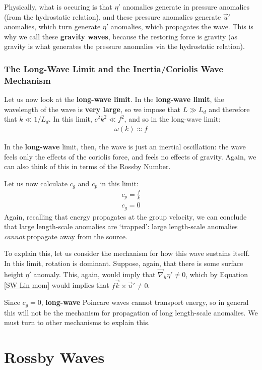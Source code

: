 Physically, what is occuring is that $\eta'$ anomalies generate in pressure anomalies (from the hydrostatic relation), and these pressure anomalies generate $\vec{u}'$ anomalies, which turn generate $\eta'$ anomalies, which propagates the wave. This is why we call these \textbf{gravity waves}, because the restoring force is gravity (as gravity is what generates the pressure anomalies via the hydrostatic relation).

\subsubsection{The Long-Wave Limit and the Inertia/Coriolis Wave Mechanism}

Let us now look at the \textbf{long-wave limit}. In the \textbf{long-wave limit}, the wavelength of the wave is \textbf{very large}, so we impose that $L\gg L_d$ and therefore that $k \ll 1/L_d$. In this limit, $c^2k^2\ll f^2$, and so in the long-wave limit:
\begin{align*}
    \boxed{\omega(k)\approx f}
\end{align*}

In the \textbf{long-wave} limit, then, the wave is just an inertial oscillation: the wave feels only the effects of the coriolis force, and feels no effects of gravity. Again, we can also think of this in terms of the Rossby Number.

Let us now calculate $c_g$ and $c_p$ in this limit:
\begin{align*}
    c_p = \frac{f}{k}\\
    c_g = 0
\end{align*}
Again, recalling that energy propagates at the group velocity, we can conclude that large length-scale anomalies are `trapped': large length-scale anomalies \textit{cannot} propagate away from the source. 

To explain this, let us consider the mechanism for how this wave sustains itself. In this limit, rotation is dominant. Suppose, again, that there is some surface height $\eta'$ anomaly. This, again, would imply that $\vec{\nabla}_h\eta'\neq 0$, which by Equation \ref{SW Lin mom} would implies that $f\vec{k}\times\vec{u}'\neq0$.

Since $c_g=0$, \textbf{long-wave} Poincare waves cannot transport energy, so in general this will not be the mechanism for propagation of long length-scale anomalies. We must turn to other mechanisms to explain this.

\section{Rossby Waves}

